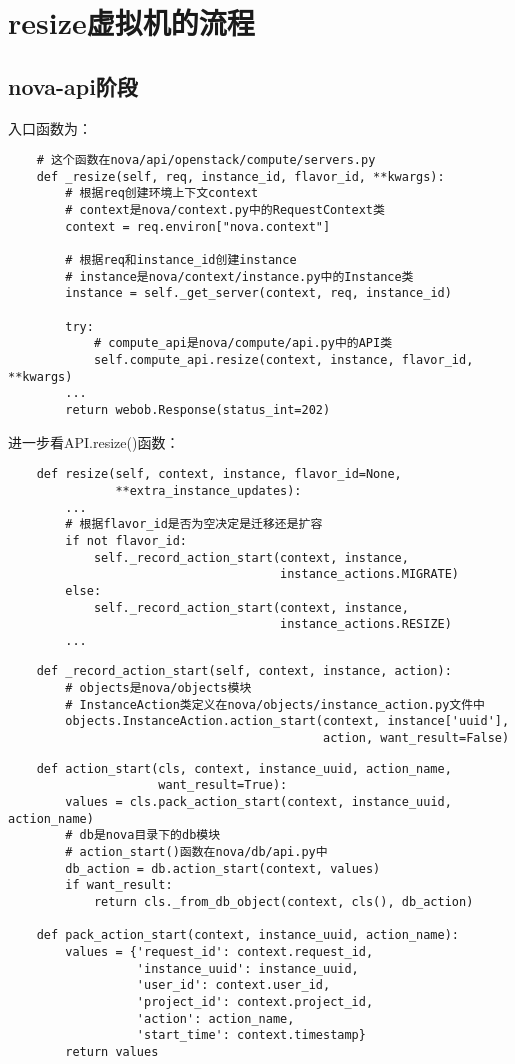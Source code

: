 \documentclass[a4paper,left=1.5cm,right=1.5cm,11pt]{article}
\begin{document}
\tableofcontents

\clearpage

\section{resize虚拟机的流程}
\subsection{nova-api阶段}
	入口函数为：
	\begin{lstlisting}
	# 这个函数在nova/api/openstack/compute/servers.py
	def _resize(self, req, instance_id, flavor_id, **kwargs):
		# 根据req创建环境上下文context
		# context是nova/context.py中的RequestContext类
        context = req.environ["nova.context"]

		# 根据req和instance_id创建instance
		# instance是nova/context/instance.py中的Instance类
        instance = self._get_server(context, req, instance_id)

        try:
			# compute_api是nova/compute/api.py中的API类
            self.compute_api.resize(context, instance, flavor_id, **kwargs)
        ...
        return webob.Response(status_int=202)
	\end{lstlisting}

	进一步看API.resize()函数：
	\begin{lstlisting}
	def resize(self, context, instance, flavor_id=None,
               **extra_instance_updates):
		...
		# 根据flavor_id是否为空决定是迁移还是扩容
        if not flavor_id:
            self._record_action_start(context, instance,
                                      instance_actions.MIGRATE)
        else:
            self._record_action_start(context, instance,
                                      instance_actions.RESIZE)
		...
	\end{lstlisting}

	\begin{lstlisting}
	def _record_action_start(self, context, instance, action):
		# objects是nova/objects模块
		# InstanceAction类定义在nova/objects/instance_action.py文件中
        objects.InstanceAction.action_start(context, instance['uuid'],
                                            action, want_result=False)
	\end{lstlisting}

	\begin{lstlisting}
	def action_start(cls, context, instance_uuid, action_name,
                     want_result=True):
        values = cls.pack_action_start(context, instance_uuid, action_name)
		# db是nova目录下的db模块
		# action_start()函数在nova/db/api.py中
        db_action = db.action_start(context, values)
        if want_result:
            return cls._from_db_object(context, cls(), db_action)

	def pack_action_start(context, instance_uuid, action_name):
        values = {'request_id': context.request_id,
                  'instance_uuid': instance_uuid,
                  'user_id': context.user_id,
                  'project_id': context.project_id,
                  'action': action_name,
                  'start_time': context.timestamp}
        return values
	\end{lstlisting}
\end{document}
